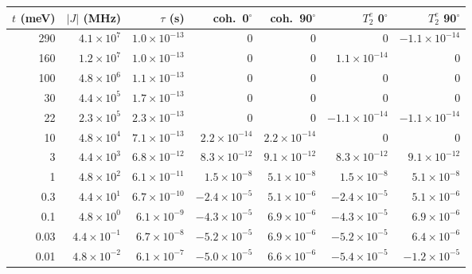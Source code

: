 \begin{tabular}{rrrrrrr}
\toprule
$t$ (meV) & $|J|$ (MHz) & $\tau$ (s) & coh.\ 0$^\circ$ & coh.\ 90$^\circ$ & $T_2^e$ 0$^\circ$ & $T_2^e$ 90$^\circ$ \\
\midrule
290 & $\ensuremath{4.1\times10^{7}}$ & $\ensuremath{1.0\times10^{-13}}$ & $0$ & $0$ & $0$ & $\ensuremath{-1.1\times10^{-14}}$ \\
160 & $\ensuremath{1.2\times10^{7}}$ & $\ensuremath{1.0\times10^{-13}}$ & $0$ & $0$ & $\ensuremath{1.1\times10^{-14}}$ & $0$ \\
100 & $\ensuremath{4.8\times10^{6}}$ & $\ensuremath{1.1\times10^{-13}}$ & $0$ & $0$ & $0$ & $0$ \\
30 & $\ensuremath{4.4\times10^{5}}$ & $\ensuremath{1.7\times10^{-13}}$ & $0$ & $0$ & $0$ & $0$ \\
22 & $\ensuremath{2.3\times10^{5}}$ & $\ensuremath{2.3\times10^{-13}}$ & $0$ & $0$ & $\ensuremath{-1.1\times10^{-14}}$ & $\ensuremath{-1.1\times10^{-14}}$ \\
10 & $\ensuremath{4.8\times10^{4}}$ & $\ensuremath{7.1\times10^{-13}}$ & $\ensuremath{2.2\times10^{-14}}$ & $\ensuremath{2.2\times10^{-14}}$ & $0$ & $0$ \\
3 & $\ensuremath{4.4\times10^{3}}$ & $\ensuremath{6.8\times10^{-12}}$ & $\ensuremath{8.3\times10^{-12}}$ & $\ensuremath{9.1\times10^{-12}}$ & $\ensuremath{8.3\times10^{-12}}$ & $\ensuremath{9.1\times10^{-12}}$ \\
1 & $\ensuremath{4.8\times10^{2}}$ & $\ensuremath{6.1\times10^{-11}}$ & $\ensuremath{1.5\times10^{-8}}$ & $\ensuremath{5.1\times10^{-8}}$ & $\ensuremath{1.5\times10^{-8}}$ & $\ensuremath{5.1\times10^{-8}}$ \\
0.3 & $\ensuremath{4.4\times10^{1}}$ & $\ensuremath{6.7\times10^{-10}}$ & $\ensuremath{-2.4\times10^{-5}}$ & $\ensuremath{5.1\times10^{-6}}$ & $\ensuremath{-2.4\times10^{-5}}$ & $\ensuremath{5.1\times10^{-6}}$ \\
0.1 & $\ensuremath{4.8\times10^{0}}$ & $\ensuremath{6.1\times10^{-9}}$ & $\ensuremath{-4.3\times10^{-5}}$ & $\ensuremath{6.9\times10^{-6}}$ & $\ensuremath{-4.3\times10^{-5}}$ & $\ensuremath{6.9\times10^{-6}}$ \\
0.03 & $\ensuremath{4.4\times10^{-1}}$ & $\ensuremath{6.7\times10^{-8}}$ & $\ensuremath{-5.2\times10^{-5}}$ & $\ensuremath{6.9\times10^{-6}}$ & $\ensuremath{-5.2\times10^{-5}}$ & $\ensuremath{6.4\times10^{-6}}$ \\
0.01 & $\ensuremath{4.8\times10^{-2}}$ & $\ensuremath{6.1\times10^{-7}}$ & $\ensuremath{-5.0\times10^{-5}}$ & $\ensuremath{6.6\times10^{-6}}$ & $\ensuremath{-5.4\times10^{-5}}$ & $\ensuremath{-1.2\times10^{-5}}$ \\
\bottomrule
\end{tabular}
